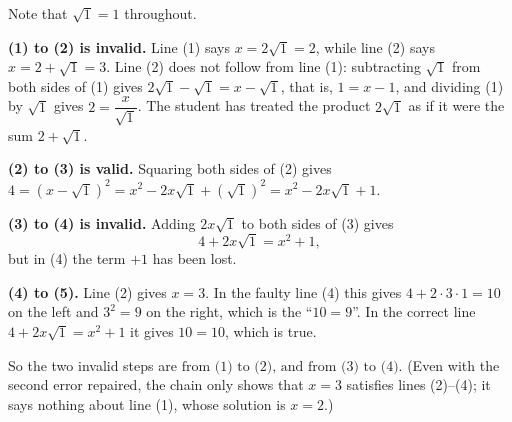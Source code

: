 Note that $\sqrt1=1$ throughout.

\textbf{(1) to (2) is invalid.} Line (1) says $x=2\sqrt1=2$, while line (2) says $x=2+\sqrt1=3$. Line (2) does not follow from line (1): subtracting $\sqrt1$ from both sides of (1) gives $2\sqrt1-\sqrt1=x-\sqrt1$, that is, $1=x-1$, and dividing (1) by $\sqrt1$ gives $2=\dfrac{x}{\sqrt1}$. The student has treated the product $2\sqrt1$ as if it were the sum $2+\sqrt1$.

\textbf{(2) to (3) is valid.} Squaring both sides of (2) gives $4=(x-\sqrt1)^2=x^2-2x\sqrt1+\left(\sqrt1\right)^2=x^2-2x\sqrt1+1$.

\textbf{(3) to (4) is invalid.} Adding $2x\sqrt1$ to both sides of (3) gives
\[4+2x\sqrt1=x^2+1,\]
but in (4) the term $+1$ has been lost.

\textbf{(4) to (5).} Line (2) gives $x=3$. In the faulty line (4) this gives $4+2\cdot3\cdot1=10$ on the left and $3^2=9$ on the right, which is the ``$10=9$''. In the correct line $4+2x\sqrt1=x^2+1$ it gives $10=10$, which is true.

So the two invalid steps are $\boxed{\text{from (1) to (2), and from (3) to (4)}}$. (Even with the second error repaired, the chain only shows that $x=3$ satisfies lines (2)--(4); it says nothing about line (1), whose solution is $x=2$.)
